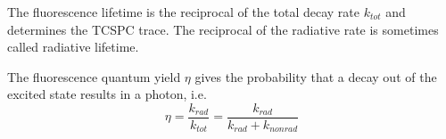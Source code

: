 The fluorescence lifetime is the reciprocal of the total decay rate $k_{tot}$ and determines the TCSPC trace. The reciprocal of the radiative rate is sometimes called radiative lifetime.

The fluorescence quantum yield $\eta$ gives the probability that a decay out of the excited state results in a photon, i.e.
\begin{equation}
 \eta   = \frac{k_{rad}}{k_{tot}} = \frac{k_{rad}}{k_{rad} + k_{non rad}}
\end{equation}














\printbibliography[segment=\therefsegment,heading=subbibliography]
